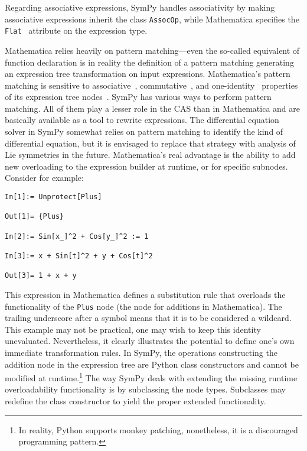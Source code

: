 
Regarding associative expressions,
SymPy handles associativity by making associative expressions inherit the
class \texttt{AssocOp},
while Mathematica specifies the \texttt{Flat}~\cite{WolframRefFlat} attribute on the expression type.




Mathematica relies heavily on pattern matching---even the so-called equivalent of function declaration is in reality
the definition of a pattern matching generating an expression tree transformation
on input expressions.
%
Mathematica's pattern matching is sensitive to
associative~\cite{WolframRefFlat}, commutative~\cite{WolframRefOrderless}, and
one-identity~\cite{WolframRefOneIdentity} properties of its expression tree
nodes~\cite{WolframRefFlatAndOrderlessFunctions}.
%
SymPy has various ways to perform pattern matching.
All of them play a lesser role in the CAS than in Mathematica
and are basically available as a tool to rewrite expressions.
The differential equation solver in SymPy somewhat relies on pattern matching to
identify the kind of differential equation, but it is envisaged to replace
that strategy with analysis of Lie symmetries in the future.
Mathematica's real advantage is the ability to add new overloading to the
expression builder at runtime, or for specific subnodes.
Consider for example:
\begin{verbatim}
In[1]:= Unprotect[Plus]

Out[1]= {Plus}

In[2]:= Sin[x_]^2 + Cos[y_]^2 := 1

In[3]:= x + Sin[t]^2 + y + Cos[t]^2

Out[3]= 1 + x + y
\end{verbatim}
This expression in Mathematica defines a substitution rule that overloads
the functionality of the \texttt{Plus} node (the node for additions in Mathematica).
The trailing underscore after a symbol means that it is to be considered a
wildcard.
This example may not be practical, one may wish to keep this identity
unevaluated.  Nevertheless, it clearly illustrates the potential to define
one's own immediate transformation rules.
In SymPy, the operations constructing the addition node in the expression tree
are Python class constructors
and cannot be modified at runtime.\footnote{In reality, Python supports monkey patching,
nonetheless, it is a discouraged programming pattern.}
The way SymPy deals with extending the missing runtime overloadability functionality
is by subclassing the node types.
Subclasses may redefine the class constructor to yield the proper
extended functionality.


